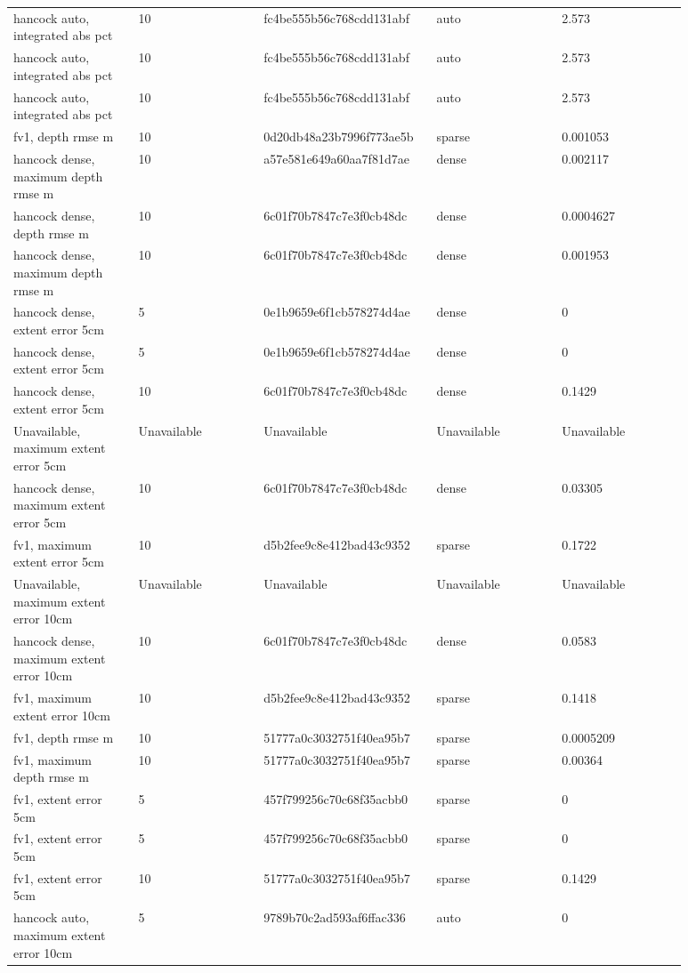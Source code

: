 \begin{longtable}{p{0.1760\linewidth}p{0.1760\linewidth}p{0.1760\linewidth}p{0.1760\linewidth}p{0.1760\linewidth}}
hancock auto, integrated abs pct & 10 & fc4be555b56c768cdd131abf & auto & 2.573 \\
hancock auto, integrated abs pct & 10 & fc4be555b56c768cdd131abf & auto & 2.573 \\
hancock auto, integrated abs pct & 10 & fc4be555b56c768cdd131abf & auto & 2.573 \\
fv1, depth rmse m & 10 & 0d20db48a23b7996f773ae5b & sparse & 0.001053 \\
hancock dense, maximum depth rmse m & 10 & a57e581e649a60aa7f81d7ae & dense & 0.002117 \\
hancock dense, depth rmse m & 10 & 6c01f70b7847c7e3f0cb48dc & dense & 0.0004627 \\
hancock dense, maximum depth rmse m & 10 & 6c01f70b7847c7e3f0cb48dc & dense & 0.001953 \\
hancock dense, extent error 5cm & 5 & 0e1b9659e6f1cb578274d4ae & dense & 0 \\
hancock dense, extent error 5cm & 5 & 0e1b9659e6f1cb578274d4ae & dense & 0 \\
hancock dense, extent error 5cm & 10 & 6c01f70b7847c7e3f0cb48dc & dense & 0.1429 \\
Unavailable, maximum extent error 5cm & Unavailable & Unavailable & Unavailable & Unavailable \\
hancock dense, maximum extent error 5cm & 10 & 6c01f70b7847c7e3f0cb48dc & dense & 0.03305 \\
fv1, maximum extent error 5cm & 10 & d5b2fee9c8e412bad43c9352 & sparse & 0.1722 \\
Unavailable, maximum extent error 10cm & Unavailable & Unavailable & Unavailable & Unavailable \\
hancock dense, maximum extent error 10cm & 10 & 6c01f70b7847c7e3f0cb48dc & dense & 0.0583 \\
fv1, maximum extent error 10cm & 10 & d5b2fee9c8e412bad43c9352 & sparse & 0.1418 \\
fv1, depth rmse m & 10 & 51777a0c3032751f40ea95b7 & sparse & 0.0005209 \\
fv1, maximum depth rmse m & 10 & 51777a0c3032751f40ea95b7 & sparse & 0.00364 \\
fv1, extent error 5cm & 5 & 457f799256c70c68f35acbb0 & sparse & 0 \\
fv1, extent error 5cm & 5 & 457f799256c70c68f35acbb0 & sparse & 0 \\
fv1, extent error 5cm & 10 & 51777a0c3032751f40ea95b7 & sparse & 0.1429 \\
hancock auto, maximum extent error 10cm & 5 & 9789b70c2ad593af6ffac336 & auto & 0 \\

\end{longtable}
